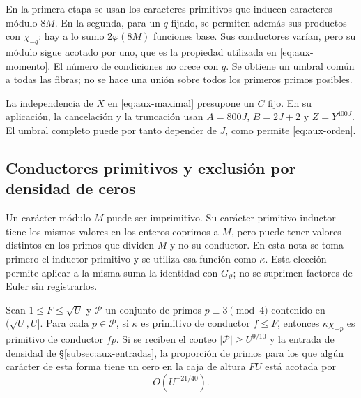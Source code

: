 En la primera etapa se usan los caracteres primitivos que inducen
caracteres módulo $8M$. En la segunda, para un $q$ fijado, se
permiten además sus productos con $\chi_{-q}$: hay a lo sumo
$2\varphi(8M)$ funciones base. Sus conductores varían, pero su
módulo sigue acotado por uno, que es la propiedad utilizada en
\eqref{eq:aux-momento}. El número de condiciones no crece con $q$.
Se obtiene un umbral común a todas las fibras; no se hace una unión
sobre todos los primeros primos posibles.

La independencia de $X$ en \eqref{eq:aux-maximal} presupone un
$C$ fijo. En su aplicación, la cancelación y la truncación usan
$A=800J$, $B=2J+2$ y $Z=Y^{400J}$. El umbral completo puede
por tanto depender de $J$, como permite \eqref{eq:aux-orden}.

\subsection{Conductores primitivos y exclusión por densidad de ceros}

Un carácter módulo $M$ puede ser imprimitivo. Su carácter primitivo
inductor tiene los mismos valores en los enteros coprimos a $M$, pero
puede tener valores distintos en los primos que dividen $M$ y no su
conductor. En esta nota se toma primero el inductor primitivo y se
utiliza esa función como $\kappa$. Esta elección permite aplicar a la
misma suma la identidad con $G_\vartheta$; no se suprimen factores de
Euler sin registrarlos.

\begin{lema}
\label{lem:aux-inyeccion}
Sean $1\le F\le\sqrt U$ y $\mathcal P$ un conjunto de primos
$p\equiv3\pmod4$ contenido en $(\sqrt U,U]$.
Para cada $p\in\mathcal P$,
si $\kappa$ es primitivo de conductor $f\le F$, entonces
$\kappa\chi_{-p}$ es primitivo de conductor $fp$.
Si se reciben el conteo $|\mathcal P|\ge U^{9/10}$ y la entrada de
densidad de §\ref{subsec:aux-entradas}, la proporción de primos para
los que algún carácter de esta forma tiene un cero en la caja de
altura $FU$ está acotada por
\begin{equation}
 O(U^{-21/40}).
 \label{eq:aux-densidad}
\end{equation}
\end{lema}

